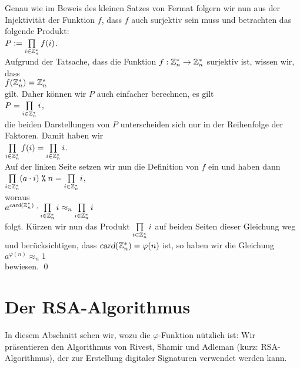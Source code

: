 Genau wie im Beweis des kleinen Satzes von Fermat folgern wir nun aus der Injektivit\"{a}t der Funktion $f$, dass
$f$ auch surjektiv sein muss und betrachten das folgende Produkt:
\\[0.2cm]
\hspace*{1.3cm}
$P := \prod\limits_{i \in \mathbb{Z}_{n}^*} f(i)$.
\\[0.2cm]
Aufgrund der Tatsache, dass die Funktion $f:\mathbb{Z}_{n}^* \rightarrow \mathbb{Z}_{n}^*$ surjektiv ist, wissen  wir, dass
\\[0.2cm]
\hspace*{1.3cm}
$f(\mathbb{Z}_{n}^*) = \mathbb{Z}_{n}^*$
\\[0.2cm]
gilt. Daher k\"{o}nnen wir $P$ auch einfacher berechnen, es gilt
\\[0.2cm]
\hspace*{1.3cm}
$P = \prod\limits_{i \in \mathbb{Z}_{n}^*} i$,
\\[0.2cm] 
die beiden Darstellungen von $P$ unterscheiden sich nur in der Reihenfolge der Faktoren.
Damit haben wir
\\[0.2cm]
\hspace*{1.3cm}
$\prod\limits_{i \in \mathbb{Z}_{n}^*} f(i) = \prod\limits_{i \in \mathbb{Z}_{n}^*} i$.
\\[0.2cm]
Auf der linken Seite setzen wir nun die Definition von $f$ ein und haben dann
\\[0.2cm]
\hspace*{1.3cm}
$\prod\limits_{i \in \mathbb{Z}_{n}^*} (a \cdot i) \;\texttt{\%}\; n = \prod\limits_{i \in \mathbb{Z}_{n}^*} i$,
\\[0.2cm]
woraus
\\[0.2cm]
\hspace*{1.3cm}
$a^{\textsl{card}(\mathbb{Z}_{n}^*)} \cdot \prod\limits_{i \in \mathbb{Z}_{n}^*} i \approx_n \prod\limits_{i \in \mathbb{Z}_{n}^*} i$
\\[0.2cm]
folgt.  K\"{u}rzen wir nun das Produkt $\prod\limits_{i \in \mathbb{Z}_{n}^*} i$ auf beiden Seiten dieser Gleichung 
weg und ber\"{u}cksichtigen, dass $\textsl{card}(\mathbb{Z}_{n}^*) = \varphi(n)$ ist, so haben wir die Gleichung
\\[0.2cm]
\hspace*{1.3cm}
$a^{\varphi(n)} \approx_n 1$
\\[0.2cm]
bewiesen.  \qed

\section{Der RSA-Algorithmus}
In diesem Abschnitt sehen wir, wozu die $\varphi$-Funktion n\"{u}tzlich ist:  Wir pr\"{a}sentieren den
Algorithmus von Rivest, Shamir und Adleman \cite{rivest:78} (kurz: RSA-Algorithmus), der zur Erstellung
digitaler Signaturen verwendet werden kann.

